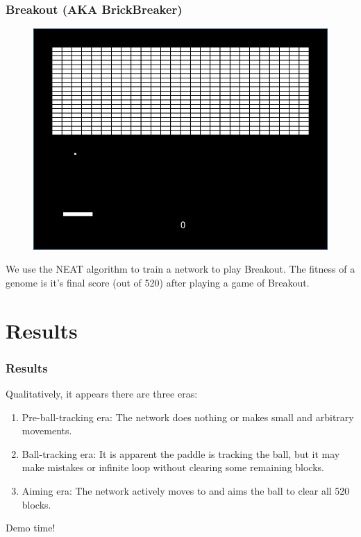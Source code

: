 \documentclass[t,pdflatex]{beamer}
\begin{document}
        \begin{frame}

            \frametitle{Breakout (AKA BrickBreaker)}
        \begin{figure}
        \centering
        \includegraphics[width=.54 \textwidth]{breakout.png}
        \end{figure}

        We use the NEAT algorithm to train a network to play Breakout.
        The fitness of a genome is it's final score (out of 520) after playing a game of Breakout.

    \end{frame}

\section{Results}

    \begin{frame}

        \frametitle{Results}
        Qualitatively, it appears there are three eras:
        \begin{enumerate}
            \item Pre-ball-tracking era: The network does nothing or makes small and arbitrary movements.
            \item Ball-tracking era: It is apparent the paddle is tracking the ball, but it may make mistakes or infinite loop without clearing some remaining blocks.
            \item Aiming era: The network actively moves to and aims the ball to clear all 520 blocks.
        \end{enumerate}

        \pause{}
        Demo time!

    \end{frame}
\end{document}
